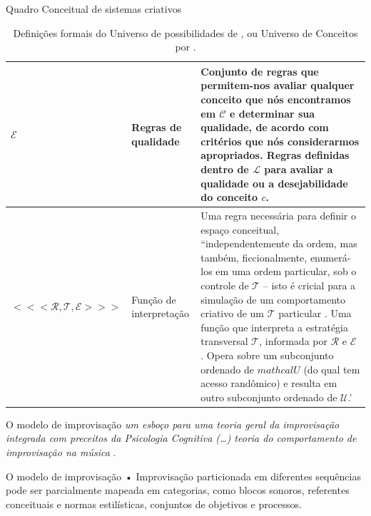\documentclass[aspectratio=169]{beamer}
\begin{document}
\begin{frame}{Quadro Conceitual de sistemas criativos}  
\begin{table}[!h]
\caption{Definições formais do Universo de possibilidades de , ou Universo de Conceitos por .}
\small
    \begin{tabular}{ | p{3.25cm} | p{4.25cm} | p{4.25cm} |}
    \hline 
    \hline 

    $\mathcal{E}$
    & \tiny{Regras de qualidade} 
    & \tiny{Conjunto de regras que permitem-nos avaliar qualquer conceito que nós encontramos em $\mathcal{C}$ e determinar sua qualidade, de acordo com critérios que nós considerarmos apropriados. Regras definidas dentro de $\mathcal{L}$ para avaliar a qualidade ou a desejabilidade do conceito $c$.}\\
    \hline

    $<<<\mathcal{R}, \mathcal{T}, \mathcal{E}>>>$
    & \tiny{Função de interpretação} 
    & \tiny{Uma regra necessária para definir o espaço conceitual, ``independentemente da ordem, mas também, ficcionalmente, enumerá-los em uma ordem particular, sob o controle de $\mathcal{T}$ -- isto é cricial para a simulação de um comportamento criativo de um $\mathcal{T}$ particular \cite{wiggins_framework_2006}. Uma função que interpreta a estratégia transversal $\mathcal{T}$, informada por $\mathcal{R}$ e $\mathcal{E}$ . Opera sobre um subconjunto ordenado de $mathcal{U}$ (do qual tem acesso randômico) e resulta em outro subconjunto ordenado de $\mathcal{U}$.'} \\
    \hline
    \hline
   
    \end{tabular}
\label{tab:universodeconceitos}
\end{table}
\end{frame}

\begin{frame}{O modelo de improvisação}
\emph{um esboço para uma teoria geral da improvisação integrada com preceitos da Psicologia Cognitiva (\ldots) teoria do comportamento de improvisação na música} \cite[p.~2]{pressing_improvisation_1987}.
\end{frame}

\begin{frame}{O modelo de improvisação}
• Improvisação particionada em diferentes sequências pode ser parcialmente mapeada em categorias, como blocos sonoros, referentes conceituais e normas estilísticas, conjuntos de objetivos e processos. 
\end{frame}
\end{document}
